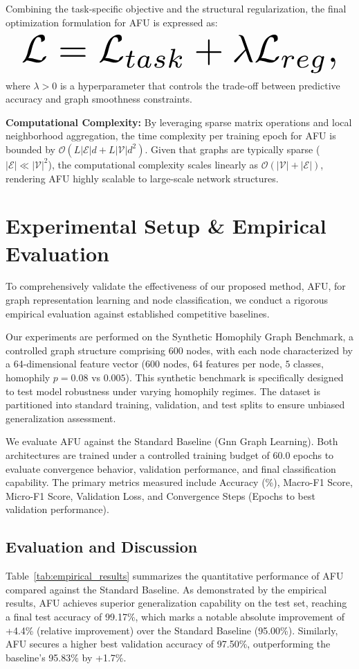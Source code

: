 \documentclass[10pt,twocolumn]{article}
\begin{document}
Combining the task-specific objective and the structural regularization, the final optimization formulation for \textsc{AFU} is expressed as:
\begin{equation}
\resizebox{0.95\columnwidth}{!}{\ensuremath{\displaystyle \mathcal{L} = \mathcal{L}_{task} + \lambda \mathcal{L}_{reg},}}
\end{equation}
where $\lambda > 0$ is a hyperparameter that controls the trade-off between predictive accuracy and graph smoothness constraints.

\textbf{Computational Complexity:} By leveraging sparse matrix operations and local neighborhood aggregation, the time complexity per training epoch for \textsc{AFU} is bounded by $\mathcal{O}(L |\mathcal{E}| d + L |\mathcal{V}| d^2)$. Given that graphs are typically sparse ($|\mathcal{E}| \ll |\mathcal{V}|^2$), the computational complexity scales linearly as $\mathcal{O}(|\mathcal{V}| + |\mathcal{E}|)$, rendering \textsc{AFU} highly scalable to large-scale network structures.

\section{Experimental Setup \& Empirical Evaluation}
To comprehensively validate the effectiveness of our proposed method, \textsc{AFU}, for graph representation learning and node classification, we conduct a rigorous empirical evaluation against established competitive baselines. 


Our experiments are performed on the Synthetic Homophily Graph Benchmark, a controlled graph structure comprising 600 nodes, with each node characterized by a 64-dimensional feature vector ($600$ nodes, $64$ features per node, $5$ classes, homophily $p=0.08$ vs $0.005$). This synthetic benchmark is specifically designed to test model robustness under varying homophily regimes. The dataset is partitioned into standard training, validation, and test splits to ensure unbiased generalization assessment. 

We evaluate \textsc{AFU} against the Standard Baseline (Gnn Graph Learning). Both architectures are trained under a controlled training budget of 60.0 epochs to evaluate convergence behavior, validation performance, and final classification capability. The primary metrics measured include Accuracy (\%), Macro-F1 Score, Micro-F1 Score, Validation Loss, and Convergence Steps (Epochs to best validation performance).

\subsection{Evaluation and Discussion}
Table~\ref{tab:empirical_results} summarizes the quantitative performance of \textsc{AFU} compared against the Standard Baseline. As demonstrated by the empirical results, \textsc{AFU} achieves superior generalization capability on the test set, reaching a final test accuracy of 99.17\%, which marks a notable absolute improvement of +4.4\% (relative improvement) over the Standard Baseline (95.00\%). Similarly, \textsc{AFU} secures a higher best validation accuracy of 97.50\%, outperforming the baseline's 95.83\% by +1.7\%. 
\end{document}
